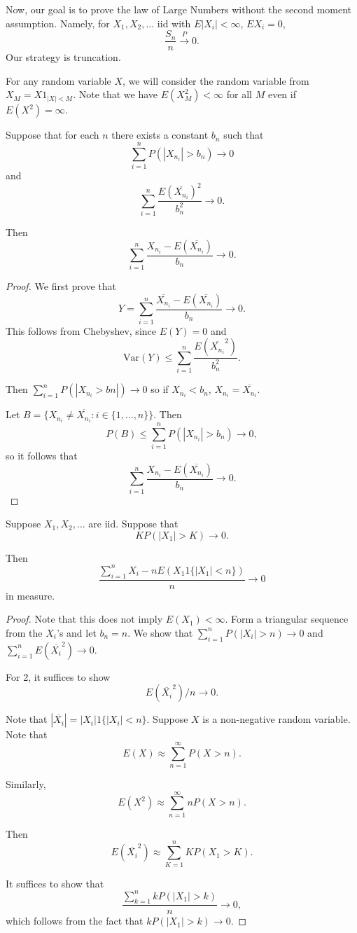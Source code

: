 \documentclass[11pt]{scrartcl}
\begin{document}
Now, our goal is to prove the law of Large Numbers without the second moment assumption.  Namely, for $X_1, X_2, \dots$ iid with $E|X_i| < \infty$, $EX_i = 0$,
$$\frac{S_n}{n} \xrightarrow{P} 0.$$
Our strategy is truncation.  
\begin{definition} For any random variable $X$, we will consider the random variable from $X_M = X1_{|X| < M}$. Note that we have $E(X_M^2) < \infty$ for all $M$ even if $E(X^2) = \infty$.
\end{definition}
\begin{thm} Suppose that for each $n$ there exists a constant $b_n$ such that 
$$\sum_{i=1}^n P(|X_{n_i}| > b_n) \rightarrow 0$$
and $$\sum_{i=1}^n\frac{ E(\overline{X_{n_i}})^2}{b_n^2} \rightarrow 0.$$

Then
$$\sum_{i=1}^n\frac{ X_{n_i} - E(\overline{X_{n_i}})}{b_{n}} \rightarrow 0.$$
\end{thm}
\begin{proof}
We first prove that 
$$Y = \sum_{i=1}^n \frac{\overline{X_{n_i}} - E(\overline{X_{n_i}})}{b_n} \rightarrow 0.$$
This follows from Chebyshev, since $E(Y) = 0$ and 
$$\text{Var}(Y) \le \sum_{i=1}^n\frac{E(\overline{X_{n_i}}^2)}{b_n^2}.$$

Then $\sum_{i=1}^n P(|X_{n_i} > bn|) \rightarrow 0$ so if $X_{n_i} < b_n$, $X_{n_i} = \overline{X_{n_i}}$.

Let $B = \{X_{n_i} \ne \overline{X_{n_i}} : i \in \{1, \dots, n\}\}.$  Then $$P(B) \le \sum_{i=1}^n P(|X_{n_i}| > b_n) \rightarrow 0,$$
so it follows that 
$$\sum_{i=1}^n\frac{ X_{n_i} - E(\overline{X_{n_i}})}{b_{n}} \rightarrow 0.$$
\end{proof}

\begin{lemma}
Suppose $X_1, X_2, \dots$ are iid.  Suppose that $$KP(|X_1| > K) \rightarrow 0.$$

Then
$$\frac{\sum_{i=1}^n X_i - n E(X_1 1\{|X_1| < n\})}{n} \rightarrow 0$$
in measure.
\end{lemma}
\begin{proof}
Note that this does not imply $E(X_1) < \infty$.  Form a triangular sequence from the $X_i$'s and let $b_n = n$. 
 We show that $\sum_{i=1}^n P(|X_i| > n) \rightarrow 0$ and $\sum_{i=1}^n E(\overline{X_i}^2) \rightarrow 0$.

For 2, it suffices to show
$$E(\overline{X_i}^2)/n \rightarrow 0.$$

Note that $|\overline{X_i}|= |X_i| 1\{|X_i| < n\}.$  Suppose $X$ is a non-negative random variable. 
Note that 
$$E(X) \approx \sum_{n=1}^{\infty} P(X > n).$$

Similarly,
$$E(X^2) \approx \sum_{n=1}^{\infty} nP(X > n).$$

Then 
$$E(\overline{X_i}^2) \approx \sum_{K = 1}^n KP(X_1 > K).$$

It suffices to show that 
$$\frac{\sum_{k=1}^n kP(|X_1| > k)}{n} \rightarrow 0,$$
which follows from the fact that $kP(|X_1| > k) \rightarrow 0$.
\end{proof}
\end{document}

